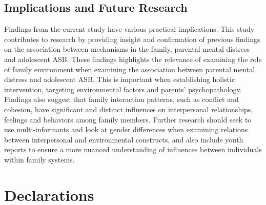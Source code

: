 \documentclass{sn-jnl}                  %
\begin{document}
\subsection{Implications and Future Research}

Findings from the current study have various practical implications. This study contributes to research by providing insight and confirmation of previous findings on the association between mechanisms in the family, parental mental distress and adolescent ASB. These findings highlights the relevance of examining the role of family environment when examining the association between parental mental distress and adolescent ASB. This is important when establishing holistic intervention, targeting environmental factors and parents' psychopathology. Findings also suggest that family interaction patterns, such as conflict and cohesion, have significant and distinct influences on interpersonal relationships, feelings and behaviors among family members. Further research should seek to use multi-informants and look at gender differences when examining relations between interpersonal and environmental constructs, and also include youth reports to ensure a more nuanced understanding of influences between individuals within family systems.




\backmatter



\section*{Declarations}

\newpage
\end{document}

